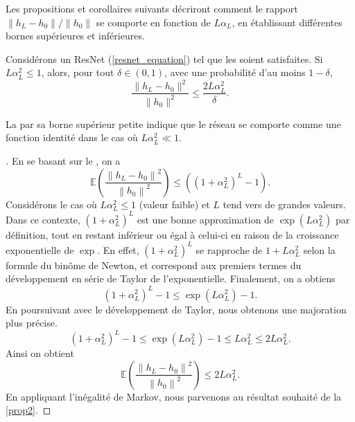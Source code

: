 Les propositions et corollaires suivants décriront comment le rapport ${\left\| h_L - h_0 \right\|} / {\left\| h_0 \right\|}$ se comporte en fonction de $L\alpha_L$, en établissant différentes bornes supérieures et inférieures.


\begin{proposition}\label{prop2}
    Considérons un ResNet (\ref{resnet_equation}) tel que les  soient satisfaites.
    Si \( L\alpha_L^2 \leqslant 1 \), alors, pour tout \( \delta \in (0, 1) \), avec une probabilité d'au moins \( 1 - \delta \),
    \[
        \frac{\|h_L - h_0\|^2}{\|h_0\|^2} \leqslant \frac{2L\alpha_L^2}{\delta}
    .\]
\end{proposition}
La  par sa borne supérieur petite indique que le réseau se comporte comme une fonction identité dans le cas où $ L \alpha ^2 _L \ll 1 $.

\begin{proof}[]
    En se basant sur le , on a 
    \[
        \mathbb{E}\left( \frac{\left\| h_L - h_0 \right\| ^2 }{\left\| h_0 \right\| ^2}\right) \leqslant \left(\left(1 + \alpha _L ^2 \right) ^L - 1 \right)
    .\]
    Considérons le cas où $L \alpha_L^2 \leqslant 1$ (valeur faible) et $L$ tend vers de grandes valeurs. Dans ce contexte, $(1 + \alpha_L^2)^L$ est une bonne approximation de $\exp(L \alpha_L^2)$ par définition, tout en restant inférieur ou égal à celui-ci en raison de la croissance exponentielle de $\exp$. En effet, $(1 + \alpha_L^2)^L$ se rapproche de $1 + L \alpha_L^2$ selon la formule du binôme de Newton, et correspond aux premiers termes du développement en série de Taylor de l'exponentielle. Finalement, on a obtiens
    \[
        (1 + \alpha _L ^2)^L -1 \leqslant \exp (L \alpha _L ^2) - 1
    .\]
    En poursuivant avec le développement de Taylor, nous obtenons une majoration plus précise.
    \[
        \left(1 + \alpha _L ^2\right)^L -1 \leqslant \exp (L \alpha _L ^2) - 1 \leqslant L \alpha _L ^2 \leqslant 2 L \alpha _L ^2
    .\]
    Ainsi on obtient 
    \[
        \mathbb{E}\left( \frac{\left\| h_L - h_0 \right\| ^2 }{\left\| h_0 \right\| ^2}\right) \leqslant 2 L \alpha _L ^2
    .\]
    En appliquant l'inégalité de Markov, nous parvenons au résultat souhaité de la \cref{prop2}.
\end{proof}



